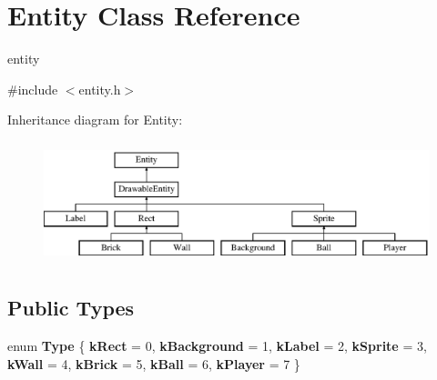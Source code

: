 \hypertarget{class_entity}{}\section{Entity Class Reference}
\label{class_entity}


entity  




{\ttfamily \#include $<$entity.\+h$>$}

Inheritance diagram for Entity\+:\begin{figure}[H]
\begin{center}
\leavevmode
\includegraphics[height=3.555556cm]{class_entity}
\end{center}
\end{figure}
\subsection*{Public Types}
\begin{DoxyCompactItemize}
\item 
\mbox{\label{class_entity_a0e96d5b4903c3e32e07780aa12fe075b}} 
enum {\bfseries Type} \{ \newline
{\bfseries k\+Rect} = 0, 
{\bfseries k\+Background} = 1, 
{\bfseries k\+Label} = 2, 
{\bfseries k\+Sprite} = 3, 
\newline
{\bfseries k\+Wall} = 4, 
{\bfseries k\+Brick} = 5, 
{\bfseries k\+Ball} = 6, 
{\bfseries k\+Player} = 7
 \}
\end{DoxyCompactItemize}
